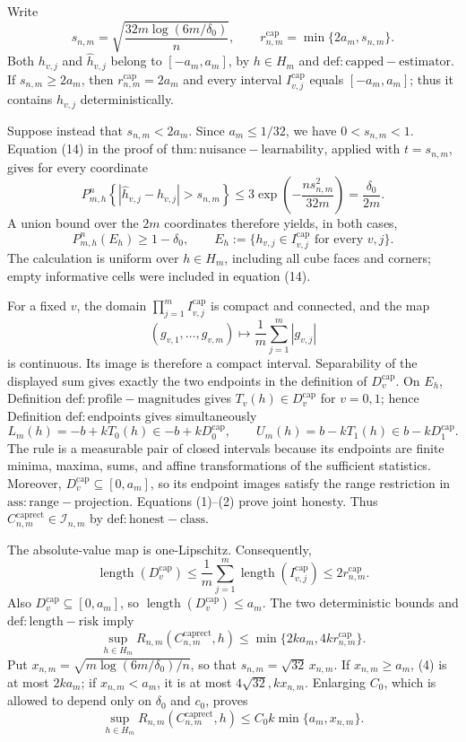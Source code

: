 Write
\[
 s_{n,m}=\sqrt{\frac{32m\log(6m/\delta_0)}{n}},
 \qquad r^{\mathrm{cap}}_{n,m}=\min\{2a_m,s_{n,m}\}.
\]
Both \(h_{v,j}\) and \(\widehat h_{v,j}\) belong to \([-a_m,a_m]\), by \(h\in H_m\) and \(\mathrm{def:capped-estimator}\). If \(s_{n,m}\geq2a_m\), then \(r^{\mathrm{cap}}_{n,m}=2a_m\) and every interval \(I^{\mathrm{cap}}_{v,j}\) equals \([-a_m,a_m]\); thus it contains \(h_{v,j}\) deterministically.

Suppose instead that \(s_{n,m}<2a_m\). Since \(a_m\leq1/32\), we have \(0<s_{n,m}<1\). Equation (14) in the proof of \(\mathrm{thm:nuisance-learnability}\), applied with \(t=s_{n,m}\), gives for every coordinate
\[
 P_{m,h}^{n}\!\left\{|\widehat h_{v,j}-h_{v,j}|>s_{n,m}\right\}
 \leq3\exp\!\left(-\frac{ns_{n,m}^2}{32m}\right)
 =\frac{\delta_0}{2m}.
\]
A union bound over the \(2m\) coordinates therefore yields, in both cases,
\[
 P_{m,h}^{n}(E_h)\geq1-\delta_0,
 \qquad
 E_h:=\{h_{v,j}\in I^{\mathrm{cap}}_{v,j}\text{ for every }v,j\}.       \tag{1}
\]
The calculation is uniform over \(h\in H_m\), including all cube faces and corners; empty informative cells were included in equation (14).

For a fixed \(v\), the domain \(\prod_{j=1}^{m}I^{\mathrm{cap}}_{v,j}\) is compact and connected, and the map
\[
 (g_{v,1},\ldots,g_{v,m})\longmapsto \frac1m\sum_{j=1}^{m}|g_{v,j}|
\]
is continuous. Its image is therefore a compact interval. Separability of the displayed sum gives exactly the two endpoints in the definition of \(D^{\mathrm{cap}}_v\). On \(E_h\), Definition \(\mathrm{def:profile-magnitudes}\) gives \(T_v(h)\in D^{\mathrm{cap}}_v\) for \(v=0,1\); hence Definition \(\mathrm{def:endpoints}\) gives simultaneously
\[
 L_m(h)=-b+kT_0(h)\in-b+kD^{\mathrm{cap}}_0,
 \qquad
 U_m(h)=b-kT_1(h)\in b-kD^{\mathrm{cap}}_1.                              \tag{2}
\]
The rule is a measurable pair of closed intervals because its endpoints are finite minima, maxima, sums, and affine transformations of the sufficient statistics. Moreover, \(D^{\mathrm{cap}}_v\subseteq[0,a_m]\), so its endpoint images satisfy the range restriction in \(\mathrm{ass:range-projection}\). Equations (1)--(2) prove joint honesty. Thus \(C^{\mathrm{caprect}}_{n,m}\in\mathcal I_{n,m}\) by \(\mathrm{def:honest-class}\).

The absolute-value map is one-Lipschitz. Consequently,
\[
 \operatorname{length}(D^{\mathrm{cap}}_v)
 \leq\frac1m\sum_{j=1}^{m}\operatorname{length}(I^{\mathrm{cap}}_{v,j})
 \leq2r^{\mathrm{cap}}_{n,m}.                                           \tag{3}
\]
Also \(D^{\mathrm{cap}}_v\subseteq[0,a_m]\), so \(\operatorname{length}(D^{\mathrm{cap}}_v)\leq a_m\). The two deterministic bounds and \(\mathrm{def:length-risk}\) imply
\[
 \sup_{h\in H_m}R_{n,m}(C^{\mathrm{caprect}}_{n,m},h)
 \leq\min\{2ka_m,4kr^{\mathrm{cap}}_{n,m}\}.                            \tag{4}
\]
Put \(x_{n,m}=\sqrt{m\log(6m/\delta_0)/n}\), so that \(s_{n,m}=\sqrt{32}\,x_{n,m}\). If \(x_{n,m}\geq a_m\), (4) is at most \(2ka_m\); if \(x_{n,m}<a_m\), it is at most \(4\sqrt{32},kx_{n,m}\). Enlarging \(C_0\), which is allowed to depend only on \(\delta_0\) and \(c_0\), proves
\[
 \sup_{h\in H_m}R_{n,m}(C^{\mathrm{caprect}}_{n,m},h)
 \leq C_0k\min\{a_m,x_{n,m}\}.                                        \tag{5}
\]


